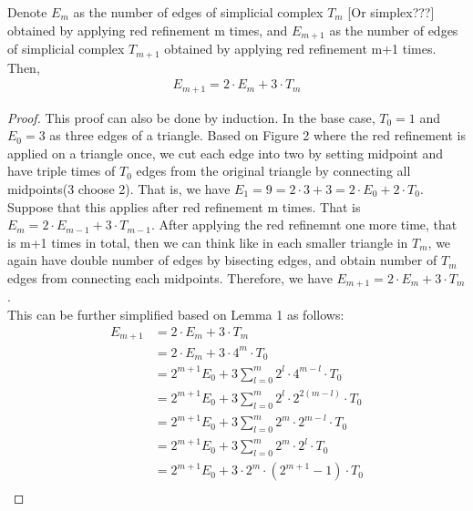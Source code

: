     \begin{lemma}
    Denote $E_{m}$ as the number of edges of simplicial complex $T_m$ [Or simplex???] obtained by applying red refinement m times, and $E_{m+1}$ as the number of edges of simplicial complex $T_{m+1}$ obtained by applying red refinement m+1 times. Then,
    \begin{align*}
    E_{m+1} = 2 \cdot E_m + 3 \cdot T_m
    \end{align*}
    \end{lemma}
    \begin{proof}
    This proof can also be done by induction. In the base case, $T_0 = 1$ and $E_0 = 3$ as three edges of a triangle. Based on Figure 2 where the red refinement is applied on a triangle once, we cut each edge into two by setting midpoint and have triple times of $T_0$ edges from the original triangle by connecting all midpoints(3 choose 2). That is, we have $E_1 = 9 = 2 \cdot 3 + 3 = 2 \cdot E_0 + 2\cdot T_0$.\\
    Suppose that this applies after red refinement m times. That is $E_{m} = 2 \cdot E_{m-1} + 3 \cdot T_{m-1}$. After applying the red refinemnt one more time, that is m+1 times in total, then we can think like in each smaller triangle in $T_m$, we again have double number of edges by bisecting edges, and obtain number of $T_m$ edges from connecting each midpoints. Therefore, we have $E_{m+1} = 2\cdot E_m + 3\cdot T_m$.\\
    This can be further simplified based on Lemma 1 as follows:
    \begin{align*}
    E_{m+1} &= 2\cdot E_m + 3\cdot T_m\\
    &= 2\cdot E_m + 3\cdot 4^m\cdot T_0\\
    &= 2^{m+1} E_0 + 3 \sum_{l = 0}^{m} 2^l\cdot 4^{m-l}\cdot T_0\\
    &= 2^{m+1} E_0 + 3 \sum_{l = 0}^{m} 2^l \cdot 2^{2(m-l)}\cdot T_0\\
    &= 2^{m+1} E_0 + 3 \sum_{l = 0}^{m} 2^m\cdot2^{m-l}\cdot T_0\\
    &= 2^{m+1} E_0 + 3 \sum_{l = 0}^{m} 2^m\cdot2^l\cdot T_0\\
    &= 2^{m+1} E_0 + 3 \cdot2^m\cdot(2^{m+1} -1)\cdot T_0\\
    \end{align*}
    \end{proof}

